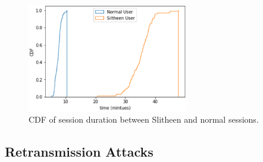 \documentclass[conference]{IEEEtran}
\begin{document}
\begin{figure}[htbp]
	\centerline{\includegraphics[width=7cm]{Figure4.eps}}
	\caption{CDF of session duration between Slitheen and normal sessions.}
	\label{fig}
\end{figure}
\subsection{Retransmission Attacks}
\end{document}
